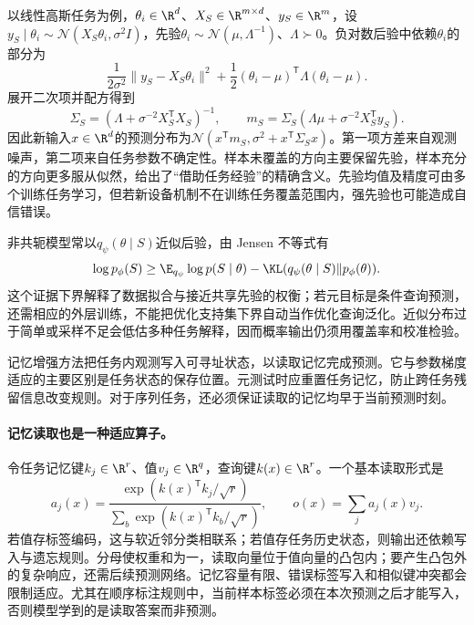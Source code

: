 以线性高斯任务为例，$\theta_i\in\R^d$、$X_S\in\R^{m\times d}$、$y_S\in\R^m$，设$y_S\mid\theta_i\sim\mathcal N(X_S\theta_i,\sigma^2I)$，先验$\theta_i\sim\mathcal N(\mu,\Lambda^{-1})$、$\Lambda\succ0$。负对数后验中依赖$\theta_i$的部分为
\begin{equation}
 \frac1{2\sigma^2}\|y_S-X_S\theta_i\|^2
 +\frac12(\theta_i-\mu)^{\mathsf T}\Lambda(\theta_i-\mu).
\end{equation}
展开二次项并配方得到
\begin{equation}
 \Sigma_S=(\Lambda+\sigma^{-2}X_S^{\mathsf T}X_S)^{-1},\qquad
 m_S=\Sigma_S(\Lambda\mu+\sigma^{-2}X_S^{\mathsf T}y_S).
\end{equation}
因此新输入$x\in\R^d$的预测分布为$\mathcal N(x^{\mathsf T}m_S,\sigma^2+x^{\mathsf T}\Sigma_Sx)$。第一项方差来自观测噪声，第二项来自任务参数不确定性。样本未覆盖的方向主要保留先验，样本充分的方向更多服从似然，给出了“借助任务经验”的精确含义。先验均值及精度可由多个训练任务学习，但若新设备机制不在训练任务覆盖范围内，强先验也可能造成自信错误。

非共轭模型常以$q_\psi(\theta\mid S)$近似后验，由 Jensen 不等式有
\begin{equation}
 \log p_\phi(S)\geq
 \E_{q_\psi}\log p(S\mid\theta)
 -\KL(q_\psi(\theta\mid S)\|p_\phi(\theta)).
\end{equation}
这个证据下界解释了数据拟合与接近共享先验的权衡；若元目标是条件查询预测，还需相应的外层训练，不能把优化支持集下界自动当作优化查询泛化。近似分布过于简单或采样不足会低估多种任务解释，因而概率输出仍须用覆盖率和校准检验。

记忆增强方法把任务内观测写入可寻址状态，以读取记忆完成预测。它与参数梯度适应的主要区别是任务状态的保存位置。元测试时应重置任务记忆，防止跨任务残留信息改变规则。对于序列任务，还必须保证读取的记忆均早于当前预测时刻。

\paragraph{记忆读取也是一种适应算子。}
令任务记忆键$k_j\in\R^r$、值$v_j\in\R^q$，查询键$k(x)\in\R^r$。一个基本读取形式是
\begin{equation}
 a_j(x)=\frac{\exp(k(x)^{\mathsf T}k_j/\sqrt r)}
 {\sum_b\exp(k(x)^{\mathsf T}k_b/\sqrt r)},\qquad
 o(x)=\sum_ja_j(x)v_j.
\end{equation}
若值存标签编码，这与软近邻分类相联系；若值存任务历史状态，则输出还依赖写入与遗忘规则。分母使权重和为一，读取向量位于值向量的凸包内；要产生凸包外的复杂响应，还需后续预测网络。记忆容量有限、错误标签写入和相似键冲突都会限制适应。尤其在顺序标注规则中，当前样本标签必须在本次预测之后才能写入，否则模型学到的是读取答案而非预测。

